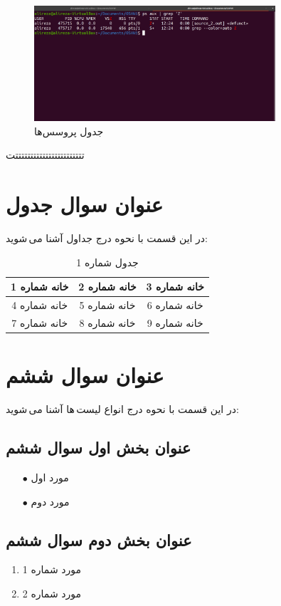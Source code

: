 \documentclass{article}
\begin{document}
\begin{figure}[H]
    \centering
    \includegraphics[width=0.8\textwidth]{figures/5.2.2.2.png}
    \caption{جدول پروسس‌ها}
    \label{fig:fig1}
\end{figure}
تتتتتتتتتتتتتتتتتتتتتتتت

\section{عنوان سوال جدول}
در این قسمت با نحوه درج جداول آشنا می\,شوید:
\begin{table}[ht]
    \centering
    \begin{tabular}{|c|c|c|}
    \hline
    خانه شماره 1 & خانه شماره 2 & خانه شماره 3\\
    \hline
    خانه شماره 4 & خانه شماره 5 & خانه شماره 6\\
    \hline
    خانه شماره 7 & خانه شماره 8 & خانه شماره 9\\
    \hline
    \end{tabular}
    \caption{جدول شماره 1}
    \label{tab:tab1}
\end{table}

\section{عنوان سوال ششم}
در این قسمت با نحوه درج انواع لیست\,ها آشنا می\,شوید:
\subsection{عنوان بخش اول سوال ششم}
\begin{itemize}
    \item [$\bullet$] مورد اول
    \item [$\bullet$] مورد دوم
\end{itemize}
\subsection{عنوان بخش دوم سوال ششم}
\begin{enumerate}
    \item مورد شماره 1
    \item مورد شماره 2
\end{enumerate}
\end{document}
